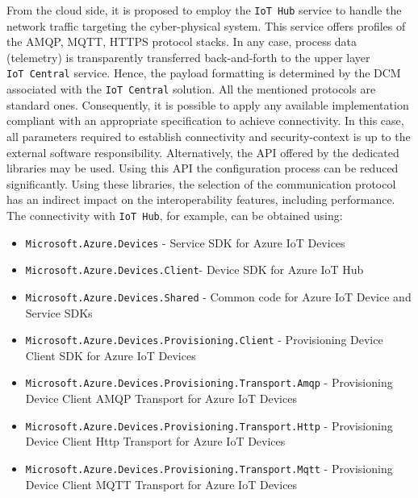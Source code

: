 \documentclass[
]{article}
\providecommand{\tightlist}{%
  \setlength{\itemsep}{0pt}\setlength{\parskip}{0pt}}
\begin{document}
From the cloud side, it is proposed to employ the \texttt{IoT\ Hub}
service to handle the network traffic targeting the cyber-physical
system. This service offers profiles of the AMQP, MQTT, HTTPS protocol
stacks. In any case, process data (telemetry) is transparently
transferred back-and-forth to the upper layer \texttt{IoT\ Central}
service. Hence, the payload formatting is determined by the DCM
associated with the \texttt{IoT\ Central} solution. All the mentioned
protocols are standard ones. Consequently, it is possible to apply any
available implementation compliant with an appropriate specification to
achieve connectivity. In this case, all parameters required to establish
connectivity and security-context is up to the external software
responsibility. Alternatively, the API offered by the dedicated
libraries may be used. Using this API the configuration process can be
reduced significantly. Using these libraries, the selection of the
communication protocol has an indirect impact on the interoperability
features, including performance. The connectivity with
\texttt{IoT\ Hub}, for example, can be obtained using:

\begin{itemize}
\tightlist
\item
  \texttt{Microsoft.Azure.Devices} - Service SDK for Azure IoT Devices
\item
  \texttt{Microsoft.Azure.Devices.Client}- Device SDK for Azure IoT Hub
\item
  \texttt{Microsoft.Azure.Devices.Shared} - Common code for Azure IoT
  Device and Service SDKs
\item
  \texttt{Microsoft.Azure.Devices.Provisioning.Client} - Provisioning
  Device Client SDK for Azure IoT Devices
\item
  \texttt{Microsoft.Azure.Devices.Provisioning.Transport.Amqp} -
  Provisioning Device Client AMQP Transport for Azure IoT Devices
\item
  \texttt{Microsoft.Azure.Devices.Provisioning.Transport.Http} -
  Provisioning Device Client Http Transport for Azure IoT Devices
\item
  \texttt{Microsoft.Azure.Devices.Provisioning.Transport.Mqtt} -
  Provisioning Device Client MQTT Transport for Azure IoT Devices
\end{itemize}
\end{document}
